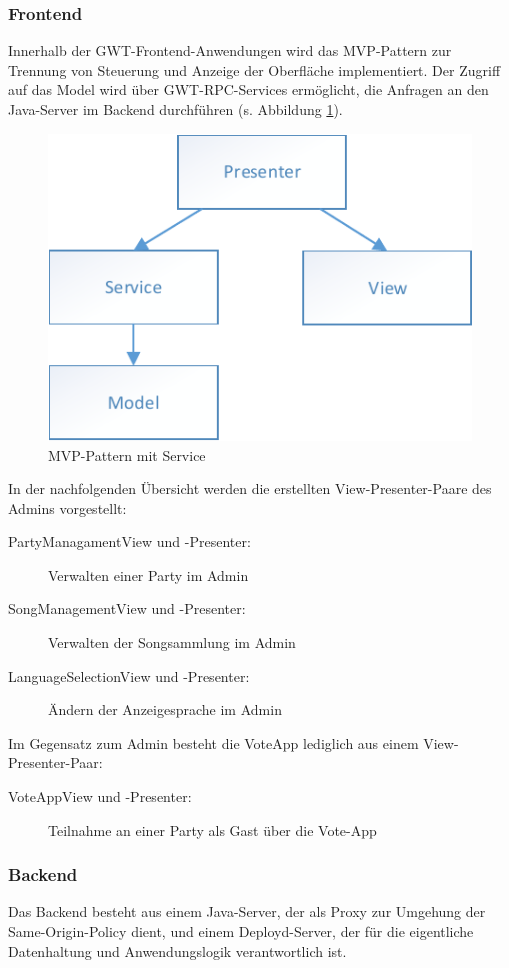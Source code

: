\subsubsection{Frontend}
Innerhalb der GWT-Frontend-Anwendungen wird das MVP-Pattern zur Trennung von Steuerung und Anzeige der Oberfläche implementiert. Der Zugriff auf das Model wird über GWT-RPC-Services ermöglicht, die Anfragen an den Java-Server im Backend durchführen (s. Abbildung \ref{fig:MVP-mit-Service}).

\begin{figure}[tbh]
\centering
\includegraphics[width=0.6\linewidth]{Bilder/MVP-mit-Service}
\caption{MVP-Pattern mit Service}
\label{fig:MVP-mit-Service}
\end{figure}

In der nachfolgenden Übersicht werden die erstellten View-Presenter-Paare des Admins vorgestellt:
\begin{description}
	\item[PartyManagamentView und -Presenter:] Verwalten einer Party im Admin
	\item[SongManagementView und -Presenter:] Verwalten der Songsammlung im Admin
	\item[LanguageSelectionView und -Presenter:] Ändern der Anzeigesprache im Admin
\end{description}

Im Gegensatz zum Admin besteht die VoteApp lediglich aus einem View-Presenter-Paar:

\begin{description}
	\item[VoteAppView und -Presenter:] Teilnahme an einer Party als Gast über die Vote-App
\end{description}

\subsubsection{Backend}
Das Backend besteht aus einem Java-Server, der als Proxy zur Umgehung der Same-Origin-Policy dient, und einem Deployd-Server, der für die eigentliche Datenhaltung und Anwendungslogik verantwortlich ist.

